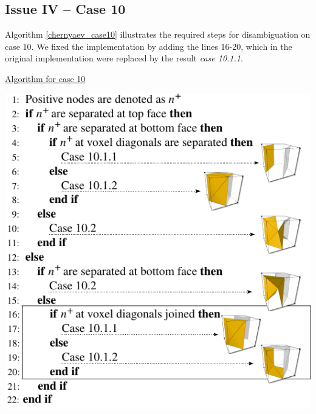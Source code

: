 \subsection{Issue IV -- Case 10}

Algorithm \ref{chernyaev_case10} illustrates the required steps for disambiguation on case 10. We fixed the \mc{} implementation by adding the lines 16-20, which in the original implementation were replaced by the result \textit{case 10.1.1}. 



\begin{algorithm}[b]
\caption{\href{http://dl.dropbox.com/u/8414964/C-MC33/webpage/alg2.html}{Algorithm for case 10}}
\label{chernyaev_case10}
\includegraphics[width=0.7\linewidth]{chapter4/figures/algorithm.pdf}
\end{algorithm}


